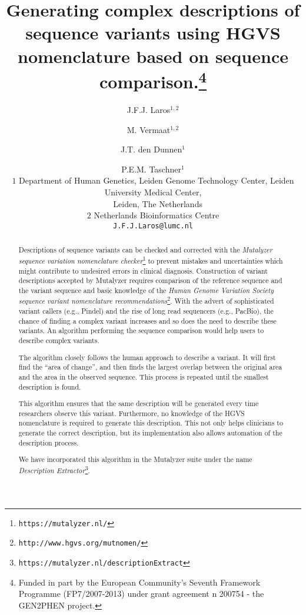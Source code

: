 \documentclass{article}
\author{J.F.J. Laros$^{1,2}$ \and M. Vermaat$^{1,2}$ \and J.T. den Dunnen$^1$
  \and P.E.M. Taschner$^1$\\
  \small $1$ Department of Human Genetics, Leiden Genome Technology Center,
    Leiden University Medical Center,\shl\\
  \small \,\ \ Leiden, The Netherlands\shl\\
  \small $2$ Netherlands Bioinformatics Centre\shl\\
  \texttt{J.F.J.Laros@lumc.nl}
  }
\title{Generating complex descriptions of sequence variants using HGVS
  nomenclature based on sequence comparison.\footnote{Funded in part by the
  European Community's Seventh Framework Programme (FP7/2007-2013) under grant
  agreement n\superscript{o} 200754 - the GEN2PHEN project.}}
\begin{document}
\maketitle

\begin{abstract} \noindent
Descriptions of sequence variants can be checked and corrected with the
\emph{Mutalyzer sequence variation nomenclature
checker}\footnote{\texttt{https://mutalyzer.nl/}} to prevent mistakes and
uncertainties which might contribute to undesired errors in clinical diagnosis.
Construction of variant descriptions accepted by Mutalyzer requires comparison
of the reference sequence and the variant sequence and basic knowledge of the
\emph{Human Genome Variation Society sequence variant nomenclature
recommendations}\footnote{\texttt{http://www.hgvs.org/mutnomen/}}. With the
advert of sophisticated variant callers (e.g., Pindel) and the rise of long
read sequencers (e.g., PacBio), the chance of finding a complex variant
increases and so does the need to describe these variants. An algorithm
performing the sequence comparison would help users to describe complex
variants.

The algorithm closely follows the human approach to describe a variant. It will
first find the ``area of change'', and then finds the largest overlap between
the original area and the area in the observed sequence. This process is
repeated until the smallest description is found.

This algorithm ensures that the same description will be generated every time
researchers observe this variant. Furthermore, no knowledge of the HGVS
nomenclature is required to generate this description. This not only helps
clinicians to generate the correct description, but its implementation also
allows automation of the description process.

We have incorporated this algorithm in the Mutalyzer suite under the name
\emph{Description
Extractor}\footnote{\texttt{https://mutalyzer.nl/descriptionExtract}}.
\end{abstract}
\end{document}
